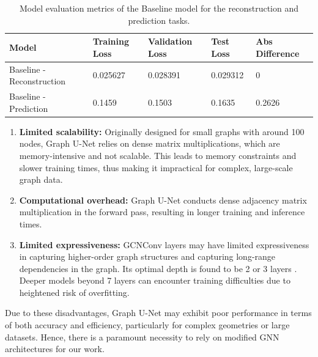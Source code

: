 \begin{table}[ht]
    \centering
    \caption{Model evaluation metrics of the Baseline model for the reconstruction and prediction tasks.} 
    \label{table:perform}
    \begin{tabular}{|l|l|l|l|l|}
    \hline
    \textbf{Model} & \textbf{Training Loss} & \textbf{Validation Loss} & \textbf{Test Loss} & \textbf{Abs Difference} \\
    \hline
    Baseline - Reconstruction & 0.025627 & 0.028391 & 0.029312 & 0\\
    \hline
    Baseline - Prediction & 0.1459 & 0.1503 & 0.1635 & 0.2626\\
    \hline
    \end{tabular}
    \end{table}
    
\begin{enumerate}
    \item \textbf{Limited scalability:} Originally designed for small graphs with around 100 nodes, Graph U-Net relies on dense matrix multiplications, which are memory-intensive and not scalable. This leads to memory constraints and slower training times, thus making it impractical for complex, large-scale graph data.
    \item \textbf{Computational overhead:} Graph U-Net conducts dense adjacency matrix multiplication in the forward pass, resulting in longer training and inference times.
    \item \textbf{Limited expressiveness:} GCNConv layers may have limited expressiveness in capturing higher-order graph structures and capturing long-range dependencies in the graph. Its optimal depth is found to be 2 or 3 layers \cite{kipf}. Deeper models beyond 7 layers can encounter training difficulties due to heightened risk of overfitting.
\end{enumerate}
Due to these disadvantages, Graph U-Net may exhibit poor performance in terms of both accuracy and efficiency, particularly for complex geometries or large datasets. Hence, there is a paramount necessity to rely on modified GNN architectures for our work.
